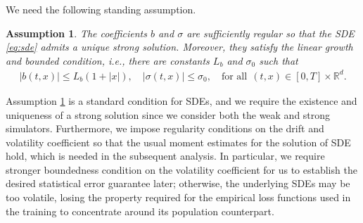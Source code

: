 \documentclass[twoside,11pt]{article}
\newcommand{\R}{\mathbb{R}}
\newtheorem{assumption}{Assumption}
\newcommand{\1}{\mathbf{1}}
\numberwithin{equation}{section}
\begin{document}
We need the following standing assumption.

\begin{assumption}\label{assum: sde coef}
The coefficients $b$ and $\sigma$ are sufficiently regular so that the SDE \eqref{eq:sde} admits a unique strong solution. Moreover, they satisfy the linear growth and bounded condition, i.e., there are constants $ L_b$ and $ \sigma_0$ such that
    \begin{equation}
        \begin{aligned}
            |b(t,x)| \le L_b(1+|x|), \quad |\sigma(t,x)| \le \sigma_0, \quad \text{for all}\ \ (t,x)\in [0,T]\times\R^d.
        \end{aligned}
    \end{equation}
\end{assumption}

Assumption \ref{assum: sde coef} is a standard condition for SDEs, and we require the existence and uniqueness of a strong solution since we consider both the weak and strong simulators. Furthermore, we impose regularity conditions on the drift and volatility coefficient so that the usual moment estimates for the solution of SDE hold, which is needed in the subsequent analysis. In particular, we require stronger boundedness condition on the volatility coefficient for us to establish the desired statistical error guarantee later; otherwise, the underlying SDEs may be too volatile, losing the property required for the empirical loss functions used in the training to concentrate around its population counterpart.
\end{document}
